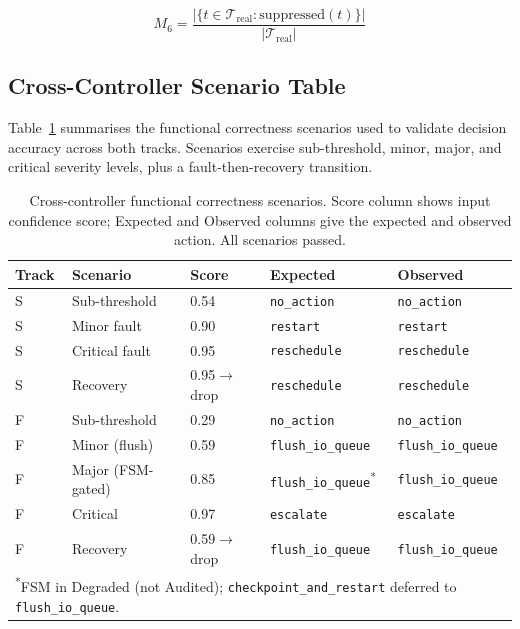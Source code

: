 \documentclass[runningheads]{llncs}
\begin{document}
\begin{equation}
M_6 = \frac{|\{t \in \mathcal{T}_{\mathrm{real}} : \mathrm{suppressed}(t)\}|}{|\mathcal{T}_{\mathrm{real}}|}
\label{eq:m6}
\end{equation}

\subsection{Cross-Controller Scenario Table}

Table~\ref{tab:scenarios} summarises the functional correctness
scenarios used to validate decision accuracy across both tracks.
Scenarios exercise sub-threshold, minor, major, and critical severity
levels, plus a fault-then-recovery transition.

\begin{table}[t]
\caption{Cross-controller functional correctness scenarios. Score
column shows input confidence score; Expected and Observed columns
give the expected and observed action. All scenarios passed.}
\label{tab:scenarios}
\centering
\begin{tabular}{lllll}
\toprule
\textbf{Track} & \textbf{Scenario} & \textbf{Score} & \textbf{Expected} & \textbf{Observed}\\
\midrule
S & Sub-threshold     & 0.54 & \texttt{no\_action}  & \texttt{no\_action}\\
S & Minor fault       & 0.90 & \texttt{restart}     & \texttt{restart}\\
S & Critical fault    & 0.95 & \texttt{reschedule}  & \texttt{reschedule}\\
S & Recovery          & 0.95$\to$drop & \texttt{reschedule} & \texttt{reschedule}\\
F & Sub-threshold     & 0.29 & \texttt{no\_action}  & \texttt{no\_action}\\
F & Minor (flush)     & 0.59 & \texttt{flush\_io\_queue} & \texttt{flush\_io\_queue}\\
F & Major (FSM-gated) & 0.85 & \texttt{flush\_io\_queue}\textsuperscript{*} & \texttt{flush\_io\_queue}\\
F & Critical          & 0.97 & \texttt{escalate}    & \texttt{escalate}\\
F & Recovery          & 0.59$\to$drop & \texttt{flush\_io\_queue} & \texttt{flush\_io\_queue}\\
\bottomrule
\multicolumn{5}{l}{\textsuperscript{*}FSM in Degraded (not Audited); \texttt{checkpoint\_and\_restart}
deferred to \texttt{flush\_io\_queue}.}
\end{tabular}
\end{table}
\end{document}
